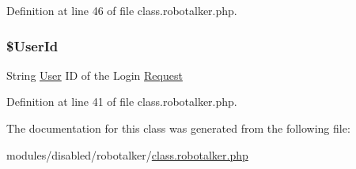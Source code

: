 Definition at line 46 of file class.\-robotalker.\-php.

\hypertarget{class_login_request_a5e6181896c4104715348824d02a3075d}{
\subsubsection[{\$\-User\-Id}]{\setlength{\rightskip}{0pt plus 5cm}\$User\-Id}}\label{class_login_request_a5e6181896c4104715348824d02a3075d}
String \hyperlink{class_user}{User} I\-D of the Login \hyperlink{class_request}{Request} 

Definition at line 41 of file class.\-robotalker.\-php.



The documentation for this class was generated from the following file\-:\begin{DoxyCompactItemize}
\item 
modules/disabled/robotalker/\hyperlink{class_8robotalker_8php}{class.\-robotalker.\-php}\end{DoxyCompactItemize}
